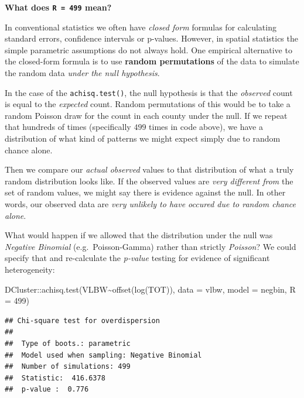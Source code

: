 \documentclass[
]{book}
\newenvironment{Shaded}{\begin{snugshade}}{\end{snugshade}}
\newcommand{\AttributeTok}[1]{\textcolor[rgb]{0.77,0.63,0.00}{#1}}
\newcommand{\DecValTok}[1]{\textcolor[rgb]{0.00,0.00,0.81}{#1}}
\newcommand{\FunctionTok}[1]{\textcolor[rgb]{0.00,0.00,0.00}{#1}}
\newcommand{\NormalTok}[1]{#1}
\newcommand{\SpecialCharTok}[1]{\textcolor[rgb]{0.00,0.00,0.00}{#1}}
\newcommand{\StringTok}[1]{\textcolor[rgb]{0.31,0.60,0.02}{#1}}
\newenvironment{rmdnote}[1]
  {
  \begin{itemize}
  \renewcommand{\labelitemi}{
    \raisebox{-.7\height}[0pt][0pt]{
      {\setkeys{Gin}{width=3em,keepaspectratio}\texttt{[image: images/\#1]}}
    }
  }
  \setlength{\fboxsep}{1em}
  \begin{note}
  \item
  }
  {
  \end{note}
  \end{itemize}
  }
\begin{document}
\begin{rmdnote}{note}
\textbf{What does \texttt{R\ =\ 499} mean?}

In conventional statistics we often have \emph{closed form} formulas for calculating standard errors, confidence intervals or p-values. However, in spatial statistics the simple parametric assumptions do not always hold. One empirical alternative to the closed-form formula is to use \textbf{random permutations} of the data to simulate the random data \emph{under the null hypothesis}.

In the case of the \texttt{achisq.test()}, the null hypothesis is that the \emph{observed} count is equal to the \emph{expected} count. Random permutations of this would be to take a random Poisson draw for the count in each county under the null. If we repeat that hundreds of times (specifically \(499\) times in code above), we have a distribution of what kind of patterns we might expect simply due to random chance alone.

Then we compare our \emph{actual observed} values to that distribution of what a truly random distribution looks like. If the observed values are \emph{very different from} the set of random values, we might say there is evidence against the null. In other words, our observed data are \emph{very unlikely to have occured due to random chance alone}.

\end{rmdnote}

What would happen if we allowed that the distribution under the null was \emph{Negative Binomial} (e.g.~Poisson-Gamma) rather than strictly \emph{Poisson}? We could specify that and re-calculate the \emph{p-value} testing for evidence of significant heterogeneity:

\begin{Shaded}
\begin{Highlighting}[]
\NormalTok{DCluster}\SpecialCharTok{::}\FunctionTok{achisq.test}\NormalTok{(VLBW}\SpecialCharTok{\textasciitilde{}}\FunctionTok{offset}\NormalTok{(}\FunctionTok{log}\NormalTok{(TOT)), }
                      \AttributeTok{data =}\NormalTok{ vlbw, }
                      \AttributeTok{model =} \StringTok{\textquotesingle{}negbin\textquotesingle{}}\NormalTok{,}
                      \AttributeTok{R =} \DecValTok{499}\NormalTok{)}
\end{Highlighting}
\end{Shaded}

\begin{verbatim}
## Chi-square test for overdispersion 
## 
##  Type of boots.: parametric 
##  Model used when sampling: Negative Binomial 
##  Number of simulations: 499 
##  Statistic:  416.6378 
##  p-value :  0.776
\end{verbatim}
\end{document}
